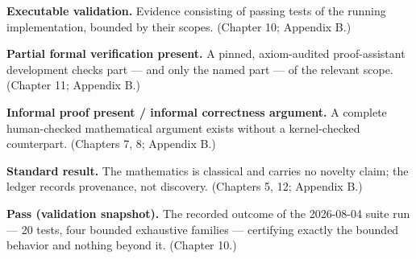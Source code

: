 \textbf{Executable validation.} Evidence consisting of passing tests
of the running implementation, bounded by their scopes. (Chapter 10;
Appendix B.)

\textbf{Partial formal verification present.} A pinned, axiom-audited
proof-assistant development checks part --- and only the named part
--- of the relevant scope. (Chapter 11; Appendix B.)

\textbf{Informal proof present / informal correctness argument.} A
complete human-checked mathematical argument exists without a
kernel-checked counterpart. (Chapters 7, 8; Appendix B.)

\textbf{Standard result.} The mathematics is classical and carries no
novelty claim; the ledger records provenance, not discovery.
(Chapters 5, 12; Appendix B.)

\textbf{Pass (validation snapshot).} The recorded outcome of the
2026-08-04 suite run --- 20 tests, four bounded exhaustive families
--- certifying exactly the bounded behavior and nothing beyond it.
(Chapter 10.)
